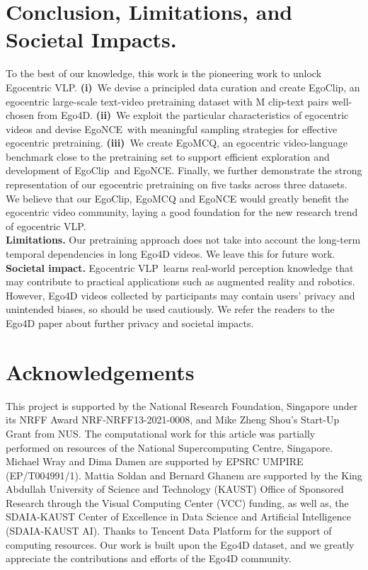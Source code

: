 \documentclass{article}
\newcommand{\vlp}{Egocentric VLP}
\newcommand{\dataset}{EgoClip}
\newcommand{\model}{EgoNCE\xspace}
\begin{document}
\section{Conclusion, Limitations, and Societal Impacts.}
To the best of our knowledge, this work is the pioneering work to unlock \vlp.
\textbf{(i)}~We devise a principled data curation and create EgoClip, an egocentric large-scale text-video pretraining dataset with M clip-text pairs well-chosen from Ego4D.
\textbf{(ii)}~We exploit the particular characteristics of egocentric videos and devise \model~with meaningful sampling strategies for effective egocentric pretraining.
\textbf{(iii)}~We create EgoMCQ, an egocentric video-language benchmark close to the pretraining set to support efficient exploration and development of \dataset~and \model.
Finally, we further demonstrate the strong representation of our egocentric pretraining on five tasks across three datasets. 
We believe that our EgoClip, EgoMCQ and EgoNCE would greatly benefit the egocentric video community, laying a good foundation for the new research trend of egocentric VLP. \\
\textbf{Limitations.} 
Our pretraining approach does not take into account the long-term temporal dependencies in long Ego4D videos. We leave this for future work. \\
\textbf{Societal impact.} 
\vlp~learns real-world perception knowledge that may contribute to practical applications such as augmented reality and robotics.
However, Ego4D videos collected by participants may contain users' privacy and unintended biases, so should be used cautiously. We refer the readers to the Ego4D paper about further privacy and societal impacts. \section{Acknowledgements}
This project is supported by the National Research Foundation, Singapore under its NRFF Award NRF-NRFF13-2021-0008, and Mike Zheng Shou's Start-Up Grant from NUS. The computational work for this article was partially performed on resources of the National Supercomputing Centre, Singapore. Michael Wray and Dima Damen are supported by EPSRC UMPIRE (EP/T004991/1). Mattia Soldan and Bernard Ghanem 
are supported by the King Abdullah University of Science and Technology (KAUST) Office of Sponsored Research through the Visual Computing Center (VCC) funding, as well as, the SDAIA-KAUST Center of Excellence in Data Science and Artificial Intelligence (SDAIA-KAUST AI).
Thanks to Tencent Data Platform for the support of computing resources.
Our work is built upon the Ego4D dataset, and we greatly appreciate the contributions and efforts of the Ego4D community.
 
\end{document}
